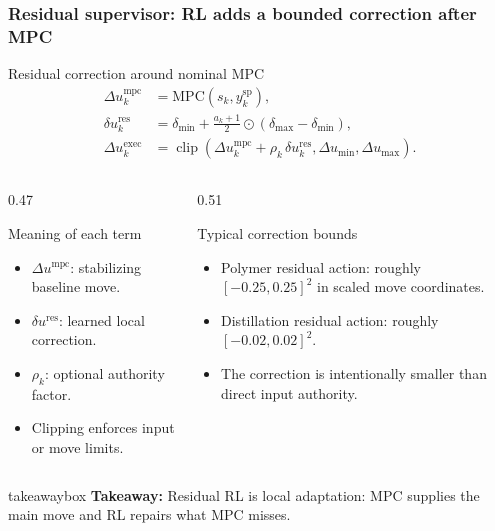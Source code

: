 \documentclass[aspectratio=169]{beamer}
\newcommand{\clip}{\operatorname{clip}}
\newcommand{\takeawaybox}[1]{%
\vspace{0.02cm}
\begin{center}
\begin{beamercolorbox}[wd=0.94\textwidth,sep=3pt,center,rounded=true,shadow=false]{takeawaybox}
\scriptsize
\textbf{\textcolor{maroon1}{Takeaway:}} #1
\end{beamercolorbox}
\end{center}
}
\begin{document}
\begin{frame}
\frametitle{\large \textbf{Residual supervisor: RL adds a bounded correction after MPC}}
\scriptsize

\begin{block}{Residual correction around nominal MPC}
\begin{align*}
\Delta u_k^{\mathrm{mpc}} &= \mathrm{MPC}(s_k,y_k^{\mathrm{sp}}),\\
\delta u_k^{\mathrm{res}} &= \delta_{\min}
+\frac{a_k+1}{2}\odot(\delta_{\max}-\delta_{\min}),\\
\Delta u_k^{\mathrm{exec}} &= \clip\!\left(
\Delta u_k^{\mathrm{mpc}}+\rho_k\,\delta u_k^{\mathrm{res}},
\Delta u_{\min},\Delta u_{\max}
\right).
\end{align*}
\end{block}

\begin{columns}[T,onlytextwidth]
\begin{column}{0.47\textwidth}
\begin{block}{Meaning of each term}
\begin{itemize}\justifying
  \setlength\itemsep{0.35ex}
  \item \(\Delta u^{\mathrm{mpc}}\): stabilizing baseline move.
  \item \(\delta u^{\mathrm{res}}\): learned local correction.
  \item \(\rho_k\): optional authority factor.
  \item Clipping enforces input or move limits.
\end{itemize}
\end{block}
\end{column}

\begin{column}{0.51\textwidth}
\begin{block}{Typical correction bounds}
\begin{itemize}\justifying
  \setlength\itemsep{0.35ex}
  \item Polymer residual action: roughly \([-0.25,0.25]^2\) in scaled move coordinates.
  \item Distillation residual action: roughly \([-0.02,0.02]^2\).
  \item The correction is intentionally smaller than direct input authority.
\end{itemize}
\end{block}
\end{column}
\end{columns}

\takeawaybox{Residual RL is local adaptation: MPC supplies the main move and RL repairs what MPC misses.}
\end{frame}
\end{document}
